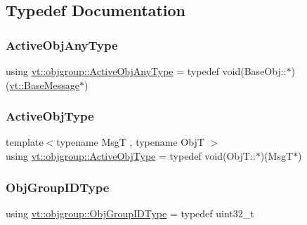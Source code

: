 \subsection{Typedef Documentation}
\mbox{\label{namespacevt_1_1objgroup_a25bec5d3c8e8bb02b62280eec62b8ac7}} 
\subsubsection{\texorpdfstring{Active\+Obj\+Any\+Type}{ActiveObjAnyType}}
{\footnotesize\ttfamily using \hyperlink{namespacevt_1_1objgroup_a25bec5d3c8e8bb02b62280eec62b8ac7}{vt\+::objgroup\+::\+Active\+Obj\+Any\+Type} = typedef void(Base\+Obj\+::$\ast$)(\hyperlink{namespacevt_ac34f95a5e2b8109b55bfba52b074443d}{vt\+::\+Base\+Message}$\ast$)}

\mbox{\label{namespacevt_1_1objgroup_a979bd9dc714fdacafc4b83f98271bc23}} 
\subsubsection{\texorpdfstring{Active\+Obj\+Type}{ActiveObjType}}
{\footnotesize\ttfamily template$<$typename MsgT , typename ObjT $>$ \\
using \hyperlink{namespacevt_1_1objgroup_a979bd9dc714fdacafc4b83f98271bc23}{vt\+::objgroup\+::\+Active\+Obj\+Type} = typedef void(Obj\+T\+::$\ast$)(MsgT$\ast$)}

\mbox{\label{namespacevt_1_1objgroup_a54a50ff6833bf618e5bedb9a3b6d0e07}} 
\subsubsection{\texorpdfstring{Obj\+Group\+I\+D\+Type}{ObjGroupIDType}}
{\footnotesize\ttfamily using \hyperlink{namespacevt_1_1objgroup_a54a50ff6833bf618e5bedb9a3b6d0e07}{vt\+::objgroup\+::\+Obj\+Group\+I\+D\+Type} = typedef uint32\+\_\+t}


